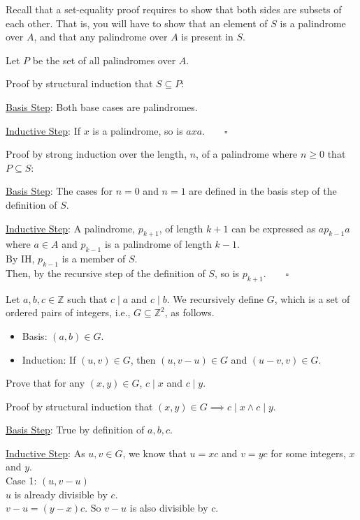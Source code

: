 \documentclass[a4paper]{exam}
\begin{document}
\begin{questions}
  Recall that a set-equality proof requires to show that both sides are subsets of each other. That is, you will have to show that an element of $S$ is a palindrome over $A$, and that any palindrome over $A$ is present in $S$.

  \begin{solution}
    Let $P$ be the set of all palindromes over $A$.

    Proof by structural induction that $S\subseteq P$:

    \underline{Basis Step}: Both base cases are palindromes.

    \underline{Inductive Step}: If $x$ is a palindrome, so is $axa.\qquad\square$

    Proof by strong induction over the length, $n$, of a palindrome where $n\ge0$ that $P\subseteq S$:
    
    \underline{Basis Step}: The cases for $n=0$ and $n=1$ are defined in the basis step of the definition of $S$.

    \underline{Inductive Step}: A palindrome, $p_{k+1}$, of length $k+1$ can be expressed as $ap_{k-1}a$ where $a\in A$ and $p_{k-1}$ is a palindrome of length $k-1$.\\
    By IH, $p_{k-1}$ is a member of $S$.\\
    Then, by the recursive step of the definition of $S$, so is $p_{k+1}.\qquad \square$
  \end{solution}

\question
  Let $a, b, c \in \mathbb{Z}$ such that $c\mid a$ and $c\mid b$. We recursively define $G$, which is a set of ordered pairs of integers, i.e., $G \subseteq \mathbb{Z}^2$, as follows.
  \begin{itemize}
  \item Basis: $(a, b) \in G$.
  \item Induction: If $(u, v) \in G$, then $(u, v - u) \in G$ and $(u - v, v) \in G$.
  \end{itemize}

  Prove that for any $(x, y) \in G$, $c\mid x$ and $c\mid y$.

  \begin{solution}
    Proof by structural induction that $(x, y) \in G \implies c\mid x \land c\mid y$.
    
    \underline{Basis Step}: True by definition of $a, b, c$.

    \underline{Inductive Step}: As $u,v\in G$, we know that $u=xc$ and $v=yc$ for some integers, $x$ and $y$.\\
    Case 1: $(u, v-u)$\\
    $u$ is already divisible by $c$.\\
    $v-u = (y-x)c$. So $v-u$ is also divisible by $c$.
    

\end{solution}
\end{questions}
\end{document}
